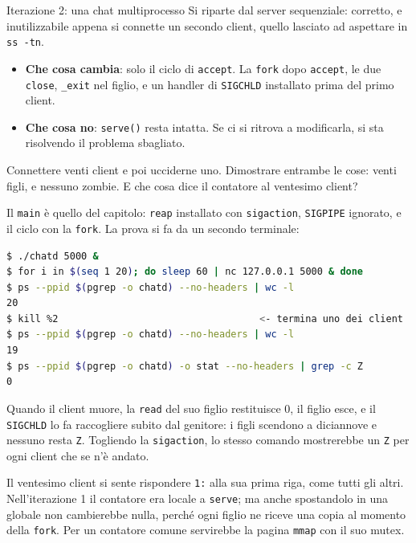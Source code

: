 \begin{esercizio}{Iterazione 2: una chat multiprocesso}
Si riparte dal server sequenziale: corretto, e inutilizzabile appena si connette un secondo client, quello lasciato ad
aspettare in \texttt{ss -tn}.
\begin{itemize}
    \item \textbf{Che cosa cambia}: solo il ciclo di \texttt{accept}. La \texttt{fork} dopo \texttt{accept}, le due
          \texttt{close}, \texttt{\_exit} nel figlio, e un handler di \texttt{SIGCHLD} installato prima del primo client.
    \item \textbf{Che cosa no}: \texttt{serve()} resta intatta. Se ci si ritrova a modificarla, si sta risolvendo il
          problema sbagliato.
\end{itemize}
Connettere venti client e poi ucciderne uno. Dimostrare entrambe le cose: venti figli, e nessuno zombie. E che cosa dice
il contatore al ventesimo client?

\svolgimento
Il \texttt{main} è quello del capitolo: \texttt{reap} installato con \texttt{sigaction}, \texttt{SIGPIPE} ignorato, e il
ciclo con la \texttt{fork}. La prova si fa da un secondo terminale:

\begin{lstlisting}[language=bash, title={Venti figli, nessuno zombie}]
$ ./chatd 5000 &
$ for i in $(seq 1 20); do sleep 60 | nc 127.0.0.1 5000 & done
$ ps --ppid $(pgrep -o chatd) --no-headers | wc -l
20
$ kill %2                                   <- termina uno dei client
$ ps --ppid $(pgrep -o chatd) --no-headers | wc -l
19
$ ps --ppid $(pgrep -o chatd) -o stat --no-headers | grep -c Z
0
\end{lstlisting}

Quando il client muore, la \texttt{read} del suo figlio restituisce 0, il figlio esce, e il \texttt{SIGCHLD} lo fa
raccogliere subito dal genitore: i figli scendono a diciannove e nessuno resta \texttt{Z}. Togliendo la
\texttt{sigaction}, lo stesso comando mostrerebbe un \texttt{Z} per ogni client che se n'è andato.

Il ventesimo client si sente rispondere \texttt{1:} alla sua prima riga, come tutti gli altri. Nell'iterazione 1 il
contatore era locale a \texttt{serve}; ma anche spostandolo in una globale non cambierebbe nulla, perché ogni figlio ne
riceve una copia al momento della \texttt{fork}. Per un contatore comune servirebbe la pagina \texttt{mmap} con il suo
mutex.
\end{esercizio}

